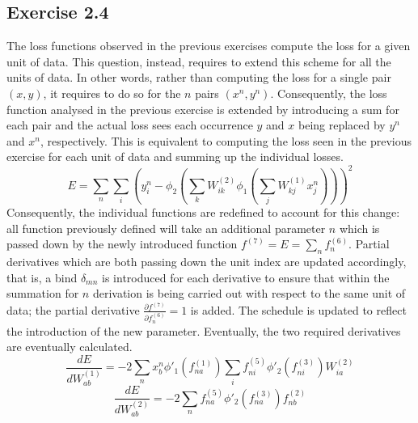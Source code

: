 \documentclass[fleqn]{report}
\begin{document}
\subsection*{Exercise 2.4}
The loss functions observed in the previous exercises compute the loss for a given unit of data. This question, instead, requires to extend this scheme for all the units of data. In other words, rather than computing the loss for a single pair $(x, y)$, it requires to do so for the $n$ pairs $(x^n, y^n)$. Consequently, the loss function analysed in the previous exercise is extended by introducing a sum for each pair and the actual loss sees each occurrence $y$ and $x$ being replaced by $y^n$ and $x^n$, respectively. This is equivalent to computing the loss seen in the previous exercise for each unit of data and summing up the individual losses.
\begin{equation}
    E=\sum_n \sum_i \left ( y^n_i - \phi_2 \left ( \sum_k W^{(2)}_{ik} \phi_1 \left ( \sum_j W^{(1)}_{kj} x^n_j \right ) \right ) \right )^2
\end{equation}
Consequently, the individual functions are redefined to account for this change: all function previously defined will take an additional parameter $n$ which is passed down by the newly introduced function $f^{(7)} = E = \sum_n f^{(6)}_n$. Partial derivatives which are both passing down the unit index are updated accordingly, that is, a bind $\delta_{mn}$ is introduced for each derivative to ensure that within the summation for $n$ derivation is being carried out with respect to the same unit of data; the partial derivative $\frac{\partial f^{(7)}}{\partial f^{(6)}_{n}} = 1$ is added. The schedule is updated to reflect the introduction of the new parameter. Eventually, the two required derivatives are eventually calculated.
\begin{equation}
    \frac{d E}{d W^{(1)}_{ab}} =  - 2 \sum_n x^n_b \phi'_1 \left (f^{(1)}_{na} \right ) \sum_i f^{(5)}_{ni} \phi'_2 \left ( f^{(3)}_{ni} \right ) W^{(2)}_{ia}
\end{equation}
\begin{equation}
    \frac{d E}{d W^{(2)}_{ab}} = - 2 \sum_n f^{(5)}_{na} \phi'_2 \left ( f^{(3)}_{na} \right ) f^{(2)}_{nb}
\end{equation}
\end{document}
